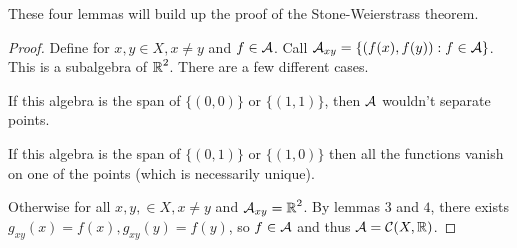 These four lemmas will build up the proof of the Stone-Weierstrass theorem.
\begin{proof}
    Define for $x, y \in X, x \neq y$ and $f \in \mathcal{A}$.
    Call $\mathcal{A}_{xy} = \{(f(x), f(y)): f \in \mathcal{A}\}$. This is a subalgebra of $\operatorname{\mathbb{R}}^2$.
    There are a few different cases. 
    
    If this algebra is the span of $\{(0, 0)\}$ or $\{(1, 1)\}$, then $\mathcal{A}$ wouldn't separate points.

    If this algebra is the span of $\{(0, 1)\}$ or $\{(1, 0)\}$
    then all the functions vanish on one of the points (which is necessarily unique).
    
    Otherwise for all $x, y, \in X, x \neq y$
    and $\mathcal{A}_{xy} = \operatorname{\mathbb{R}}^2$. By lemmas $3$ and $4$,
    there exists $g_{xy}(x) = f(x), g_{xy}(y) = f(y)$,
    so $f \in \mathcal{A}$ and thus $\mathcal{A} = \mathcal{C}(X, \operatorname{\mathbb{R}})$.
\end{proof}